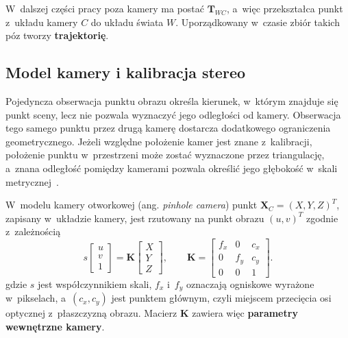 W~dalszej części pracy poza kamery ma postać $\mathbf{T}_{W C}$, a~więc przekształca punkt z~układu kamery $C$ do układu świata $W$. Uporządkowany w~czasie zbiór takich póz tworzy \textbf{trajektorię}.

\subsection{Model kamery i kalibracja stereo}
\label{subsec:model_kamery}

Pojedyncza obserwacja punktu obrazu określa kierunek, w~którym znajduje się punkt sceny, lecz nie pozwala wyznaczyć jego odległości od kamery. Obserwacja tego samego punktu przez drugą kamerę dostarcza dodatkowego ograniczenia geometrycznego. Jeżeli względne położenie kamer jest znane z~kalibracji, położenie punktu w~przestrzeni może zostać wyznaczone przez triangulację, a~znana odległość pomiędzy kamerami pozwala określić jego głębokość w~skali metrycznej~\cite{fusiello2000rectification}.

W~modelu kamery otworkowej (ang. \textit{pinhole camera}) punkt
$\mathbf{X}_C=(X,Y,Z)^T$, zapisany w~układzie kamery, jest rzutowany
na punkt obrazu $(u,v)^T$ zgodnie z~zależnością~\cite{fusiello2000rectification}
\begin{equation}
    s
    \begin{bmatrix}
        u \\
        v \\
        1
    \end{bmatrix}
    =
    \mathbf{K}
    \begin{bmatrix}
        X \\
        Y \\
        Z
    \end{bmatrix},
    \qquad
    \mathbf{K}
    =
    \begin{bmatrix}
        f_x & 0   & c_x \\
        0   & f_y & c_y \\
        0   & 0   & 1
    \end{bmatrix}.
    \label{eq:pinhole_projection}
\end{equation}
gdzie $s$ jest współczynnikiem skali, $f_x$ i~$f_y$ oznaczają ogniskowe
wyrażone w~pikselach, a~$(c_x,c_y)$ jest punktem głównym, czyli miejscem
przecięcia osi optycznej z~płaszczyzną obrazu. Macierz $\mathbf{K}$
zawiera więc \textbf{parametry wewnętrzne kamery}.

